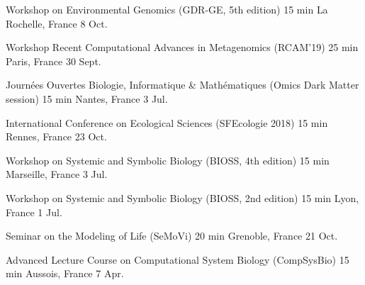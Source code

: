 

\begin{cvhonors}
  \cvhonor
    {Workshop on Environmental Genomics (GDR-GE, 5th edition)} %
    {15 min} %
    {La Rochelle, France} %
    {8 Oct.} %
    
  \cvhonor
    {Workshop Recent Computational Advances in Metagenomics (RCAM'19)} %
    {25 min} %
    {Paris, France} %
    {30 Sept.} %

  \cvhonor
    {Journées Ouvertes Biologie, Informatique \& Mathématiques (Omics Dark Matter session)}
    {15 min} %
    {Nantes, France} %
    {3 Jul.} %
    
\end{cvhonors}


\begin{cvhonors}

  \cvhonor
    {International Conference on Ecological Sciences (SFEcologie 2018)} %
    {15 min} %
    {Rennes, France} %
    {23 Oct.} %

  \cvhonor
    {Workshop on Systemic and Symbolic Biology (BIOSS, 4th edition)} %
    {15 min} %
    {Marseille, France} %
    {3 Jul.} %

\end{cvhonors}


\begin{cvhonors}

  \cvhonor
    {Workshop on Systemic and Symbolic Biology (BIOSS, 2nd edition)} %
    {15 min} %
    {Lyon, France} %
    {1 Jul.} %

\end{cvhonors}


\begin{cvhonors}

  \cvhonor
    {Seminar on the Modeling of Life (SeMoVi)} %
    {20 min} %
    {Grenoble, France} %
    {21 Oct.} %

  \cvhonor
    {Advanced Lecture Course on Computational System Biology (CompSysBio)} %
    {15 min} %
    {Aussois, France} %
    {7 Apr.} %
    
\end{cvhonors}